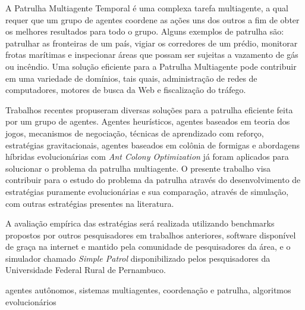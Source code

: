 A Patrulha Multiagente Temporal é uma complexa tarefa multiagente, a qual 
requer que um grupo de agentes coordene as ações uns dos outros a fim de 
obter os melhores resultados para todo o grupo. Alguns exemplos de patrulha 
são: patrulhar as fronteiras de um país, vigiar os corredores de um prédio, 
monitorar frotas marítimas e inspecionar áreas que possam ser sujeitas a 
vazamento de gás ou incêndio. Uma solução eficiente para a Patrulha 
Multiagente pode contribuir em uma variedade de domínios, tais quais, 
administração de redes de computadores, motores de busca da Web e 
fiscalização do tráfego.

Trabalhos recentes propuseram diversas soluções para a patrulha eficiente 
feita por um grupo de agentes. Agentes heurísticos, agentes baseados em 
teoria dos jogos, mecanismos de negociação, 
técnicas de aprendizado com reforço, estratégias gravitacionais, agentes 
baseados em colônia de formigas e abordagens híbridas evolucionárias com \textit{Ant Colony Optimization} já foram 
aplicados para solucionar o problema da patrulha multiagente. O presente 
trabalho visa contribuir para o estudo do problema da patrulha através do 
desenvolvimento de estratégias puramente evolucionárias e sua comparação, 
através de simulação, com outras estratégias presentes na literatura.

A avaliação empírica das estratégias será realizada utilizando benchmarks 
propostos por outros pesquisadores em trabalhos anteriores, software 
disponível de graça na internet e mantido pela comunidade de pesquisadores da 
área, e o simulador chamado \textit{Simple Patrol} disponibilizado pelos pesquisadores 
da Universidade Federal Rural de Pernambuco.

\begin{keywords}
agentes autônomos, sistemas multiagentes, coordenação e patrulha, algoritmos 
evolucionários
\end{keywords}